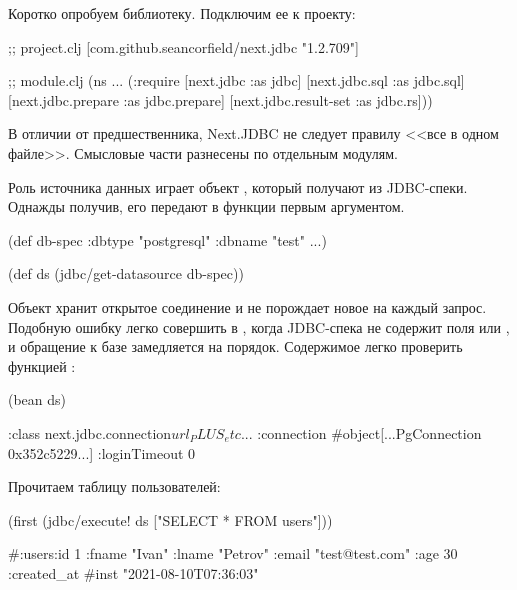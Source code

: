 Коротко опробуем библиотеку. Подключим ее к проекту:

\begin{english}
  \begin{clojure}
;; project.clj
[com.github.seancorfield/next.jdbc "1.2.709"]

;; module.clj
(ns ...
  (:require
   [next.jdbc :as jdbc]
   [next.jdbc.sql :as jdbc.sql]
   [next.jdbc.prepare :as jdbc.prepare]
   [next.jdbc.result-set :as jdbc.rs]))
  \end{clojure}
\end{english}

В отличии от предшественника, Next.JDBC не следует правилу <<все в одном файле>>. Смысловые части разнесены по отдельным модулям.

Роль источника данных играет объект , который получают из JDBC-спеки. Однажды получив, его передают в функции первым аргументом.

\begin{english}
  \begin{clojure}
(def db-spec {:dbtype "postgresql" :dbname "test" ...})

(def ds (jdbc/get-datasource db-spec))
  \end{clojure}
\end{english}

Объект  хранит открытое соединение и не порождает новое на каждый запрос. Подобную ошибку легко совершить в , когда JDBC-спека не содержит поля  или , и обращение к базе замедляется на порядок. Содержимое  легко проверить функцией :

\begin{english}
  \begin{clojure}
(bean ds)

{:class next.jdbc.connection$url_PLUS_etc$...
 :connection #object[...PgConnection 0x352c5229...]
 :loginTimeout 0}
  \end{clojure}
\end{english}

Прочитаем таблицу пользователей:

\begin{english}
  \begin{clojure}
(first (jdbc/execute! ds ["SELECT * FROM users"]))

#:users{:id 1
        :fname "Ivan"
        :lname "Petrov"
        :email "test@test.com"
        :age 30
        :created_at #inst "2021-08-10T07:36:03"}
  \end{clojure}
\end{english}


